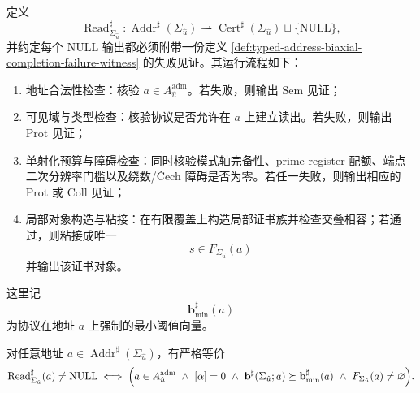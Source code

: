 \begin{definition}[完备相位对象的编译式读取器]\label{def:typed-address-biaxial-completion-compiled-reader}
定义
\[
\operatorname{Read}^{\sharp}_{\Sigma_{\hat u}}:
\operatorname{Addr}^{\sharp}(\Sigma_{\hat u})
\rightharpoonup
\operatorname{Cert}^{\sharp}(\Sigma_{\hat u})\sqcup\{\mathrm{NULL}\},
\]
并约定每个 \(\mathrm{NULL}\) 输出都必须附带一份定义 \ref{def:typed-address-biaxial-completion-failure-witness} 的失败见证。其运行流程如下：
\begin{enumerate}
  \item 地址合法性检查：核验 \(a\in A^{\mathrm{adm}}_{\hat u}\)。若失败，则输出 \(\mathrm{Sem}\) 见证；
  \item 可见域与类型检查：核验协议是否允许在 \(a\) 上建立读出。若失败，则输出 \(\mathrm{Prot}\) 见证；
  \item 单射化预算与障碍检查：同时核验模式轴完备性、prime-register 配额、端点二次分辨率门槛以及绕数/Čech 障碍是否为零。若任一失败，则输出相应的 \(\mathrm{Prot}\) 或 \(\mathrm{Coll}\) 见证；
  \item 局部对象构造与粘接：在有限覆盖上构造局部证书族并检查交叠相容；若通过，则粘接成唯一
  \[
  s\in F_{\Sigma_{\hat u}}(a)
  \]
  并输出该证书对象。
\end{enumerate}
\end{definition}

这里记
\[
\mathbf b^\sharp_{\min}(a)
\]
为协议在地址 \(a\) 上强制的最小阈值向量。

\begin{proposition}[编译式可读性判据]\label{prop:typed-address-biaxial-completion-compiled-readability}
对任意地址 \(a\in \operatorname{Addr}^{\sharp}(\Sigma_{\hat u})\)，有严格等价
\[
\operatorname{Read}^{\sharp}_{\Sigma_{\hat u}}(a)\neq \mathrm{NULL}
\iff
\Bigl(
a\in A^{\mathrm{adm}}_{\hat u}
\ \land\
[\alpha]=0
\ \land\
\mathbf b^\sharp(\Sigma_{\hat u};a)\succeq \mathbf b^\sharp_{\min}(a)
\ \land\
F_{\Sigma_{\hat u}}(a)\neq\varnothing
\Bigr).
\]
\end{proposition}

